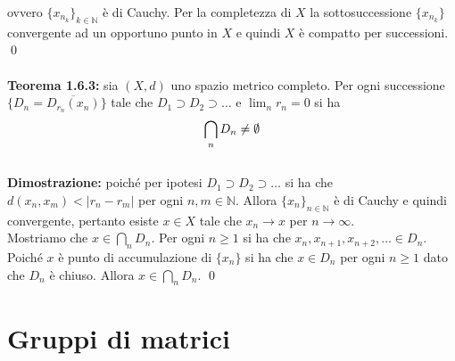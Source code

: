 \documentclass{article}
\begin{document}
ovvero $\{x_{n_k}\}_{k \in \mathbb{N}}$ è di Cauchy. Per la completezza di $X$ la sottosuccessione $\{x_{n_k}\}$ convergente ad un opportuno punto in $X$ e quindi $X$ è compatto per successioni. \qed \\ \\
\textbf{Teorema 1.6.3:} sia $(X, d)$ uno spazio metrico completo. Per ogni successione $\{D_n = \overline{{D}_{r_n}(x_n)}\}$ tale che $D_1 \supset D_2 \supset \dots$ e $\lim_n r_n = 0$ si ha 
\begin{align}
    \bigcap_{n}D_n \neq \emptyset \notag
\end{align} \\

\textbf{Dimostrazione:} poiché per ipotesi $D_1 \supset D_2 \supset \dots$ si ha che $d(x_n, x_m) < |r_n - r_m|$ per ogni $n, m \in \mathbb{N}$. Allora $\{x_n\}_{n \in \mathbb{N}}$ è di Cauchy e quindi convergente, pertanto esiste $x \in X$ tale che $x_n \rightarrow x$ per $n \rightarrow \infty$. \\
Mostriamo che $x \in \bigcap_n D_n$. Per ogni $n \geq 1$ si ha che $x_n, x_{n + 1}, x_{n + 2}, \dots \in D_n$. Poiché $x$ è punto di accumulazione di $\{x_n\}$ si ha che $x \in D_n$ per ogni $n \geq 1$ dato che $D_n$ è chiuso. Allora $x \in \bigcap_n D_n$. \qed

\newpage
\section{Gruppi di matrici}
\end{document}
